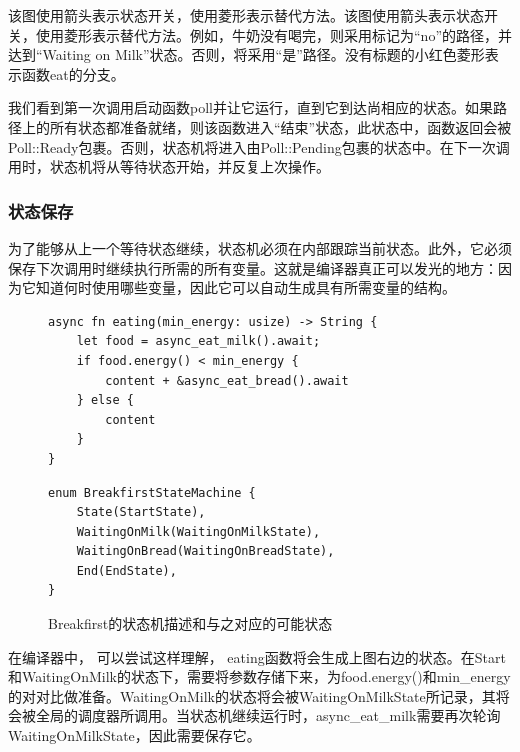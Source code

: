 该图使用箭头表示状态开关，使用菱形表示替代方法。该图使用箭头表示状态开关，使用菱形表示替代方法。例如，牛奶没有喝完，则采用标记为“no”的路径，并达到“Waiting on Milk”状态。否则，将采用“是”路径。没有标题的小红色菱形表示函数eat的分支。

我们看到第一次调用启动函数poll并让它运行，直到它到达尚相应的状态。如果路径上的所有状态都准备就绪，则该函数进入“结束”状态，此状态中，函数返回会被 Poll::Ready包裹。否则，状态机将进入由Poll::Pending包裹的状态中。在下一次调用时，状态机将从等待状态开始，并反复上次操作。


\subsubsection{状态保存}

为了能够从上一个等待状态继续，状态机必须在内部跟踪当前状态。此外，它必须保存下次调用时继续执行所需的所有变量。这就是编译器真正可以发光的地方：因为它知道何时使用哪些变量，因此它可以自动生成具有所需变量的结构。

\begin{figure}[htbp]
    \figureCapSet
	\centering
	\begin{minipage}{0.49\linewidth}%
		\centering
        \begin{lstlisting}[frame=none]
async fn eating(min_energy: usize) -> String {
    let food = async_eat_milk().await;
    if food.energy() < min_energy {
        content + &async_eat_bread().await
    } else {
        content
    }
}
        \end{lstlisting}
	\end{minipage}
    \hfill
	\begin{minipage}{0.49\linewidth}
		\centering
        \begin{lstlisting}[frame=none]
enum BreakfirstStateMachine {
    State(StartState),
    WaitingOnMilk(WaitingOnMilkState),
    WaitingOnBread(WaitingOnBreadState),
    End(EndState),
}
        \end{lstlisting}
	\end{minipage}
    \caption{Breakfirst的状态机描述和与之对应的可能状态}
\end{figure}


在编译器中， 可以尝试这样理解， eating函数将会生成上图右边的状态。在Start和WaitingOnMilk的状态下，需要将参数存储下来，为food.energy()和min\_energy的对对比做准备。WaitingOnMilk的状态将会被WaitingOnMilkState所记录，其将会被全局的调度器所调用。当状态机继续运行时，async\_eat\_milk需要再次轮询WaitingOnMilkState，因此需要保存它。

